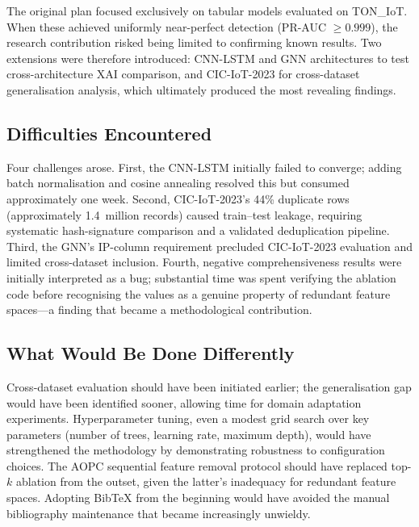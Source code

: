 \documentclass[12pt,a4paper]{report}
\begin{document}
The original plan focused exclusively on tabular models evaluated on TON\_IoT. When these achieved uniformly near-perfect detection (PR-AUC $\geq 0.999$), the research contribution risked being limited to confirming known results. Two extensions were therefore introduced: CNN-LSTM and GNN architectures to test cross-architecture XAI comparison, and CIC-IoT-2023 for cross-dataset generalisation analysis, which ultimately produced the most revealing findings.

\subsection*{Difficulties Encountered}

Four challenges arose. First, the CNN-LSTM initially failed to converge; adding batch normalisation and cosine annealing resolved this but consumed approximately one week. Second, CIC-IoT-2023's 44\% duplicate rows (approximately 1.4~million records) caused train--test leakage, requiring systematic hash-signature comparison and a validated deduplication pipeline. Third, the GNN's IP-column requirement precluded CIC-IoT-2023 evaluation and limited cross-dataset inclusion. Fourth, negative comprehensiveness results were initially interpreted as a bug; substantial time was spent verifying the ablation code before recognising the values as a genuine property of redundant feature spaces---a finding that became a methodological contribution.

\subsection*{What Would Be Done Differently}

Cross-dataset evaluation should have been initiated earlier; the generalisation gap would have been identified sooner, allowing time for domain adaptation experiments. Hyperparameter tuning, even a modest grid search over key parameters (number of trees, learning rate, maximum depth), would have strengthened the methodology by demonstrating robustness to configuration choices. The AOPC sequential feature removal protocol should have replaced top-$k$ ablation from the outset, given the latter's inadequacy for redundant feature spaces. Adopting Bib\TeX{} from the beginning would have avoided the manual bibliography maintenance that became increasingly unwieldy.

\end{document}
